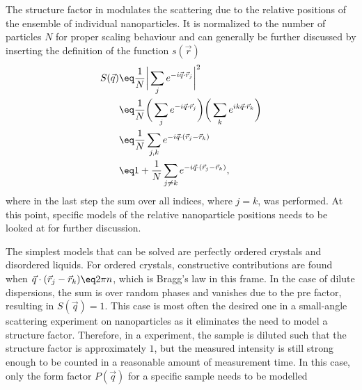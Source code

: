 \documentclass[\main/dresen_thesis.tex]{subfiles}
\begin{document}
The structure factor in  modulates the scattering due to the relative positions of the ensemble of individual nanoparticles.
It is normalized to the number of particles $N$ for proper scaling behaviour and can generally be further discussed by inserting the definition of the function $s(\vec{r})$
\begin{align}
  S(\vec{q}) &\eq \frac{1}{N} \bigg| \sum_j  e^{-i\vec{q} \cdot \vec{r}_j} \bigg|^2\\
  &\eq \frac{1}{N}  \bigg( \sum_j  e^{-i\vec{q} \cdot \vec{r}_j} \bigg) \bigg( \sum_k  e^{i k\vec{q} \cdot \vec{r}_k} \bigg)\\
  &\eq \frac{1}{N}  \sum_{j, k}  e^{-i\vec{q} \cdot (\vec{r}_j - \vec{r}_k) }\\
  &\eq 1 + \frac{1}{N}  \sum_{j \neq k}  e^{-i\vec{q} \cdot (\vec{r}_j - \vec{r}_k)},
\end{align}
where in the last step the sum over all indices, where $j=k$, was performed.
At this point, specific models of the relative nanoparticle positions needs to be looked at for further discussion.

The simplest models that can be solved are perfectly ordered crystals and disordered liquids.
For ordered crystals, constructive contributions are found when $\vec{q} \cdot (\vec{r}_j - \vec{r}_k) \eq 2 \pi n$, which is Bragg's law in this frame.
In the case of dilute dispersions, the sum is over random phases and vanishes due to the pre factor, resulting in $S(\vec{q}) = 1$.
This case is most often the desired one in a small-angle scattering experiment on nanoparticles as it eliminates the need to model a structure factor.
Therefore, in a experiment, the sample is diluted such that the structure factor is approximately $1$, but the measured intensity is still strong enough to be counted in a reasonable amount of measurement time.
In this case, only the form factor $P(\vec{q})$ for a specific sample needs to be modelled
\end{document}
